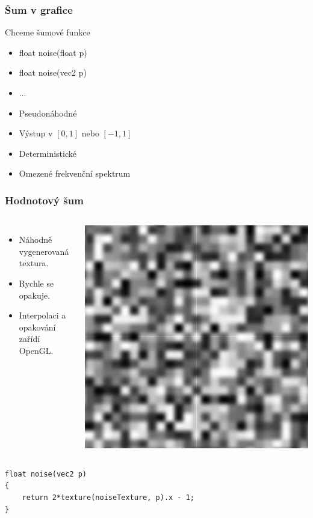 \begin{frame}
    \frametitle{Šum v grafice}
    Chceme šumové funkce
    \begin{itemize}
        \item float noise(float p)
        \item float noise(vec2 p)
        \item ...
    \end{itemize}
    \vfill
    \begin{itemize}
        \item Pseudonáhodné
        \item Výstup v $[0,1]$ nebo $[-1,1]$
        \item Deterministické
        \item Omezené frekvenční spektrum
    \end{itemize}
\end{frame}

\begin{frame}[fragile]
    \frametitle{Hodnotový šum}
    \begin{columns}[c]
        \begin{itemize}
            \item Náhodně vygenerovaná textura.
            \item Rychle se opakuje.
            \item Interpolaci a opakování zařídí OpenGL.
        \end{itemize}
        \includegraphics[width=\textwidth]{pics/procedural/value_noise.eps}
    \end{columns}

  \begin{verbatim}
float noise(vec2 p)
{
    return 2*texture(noiseTexture, p).x - 1;
}
  \end{verbatim}
\end{frame}

